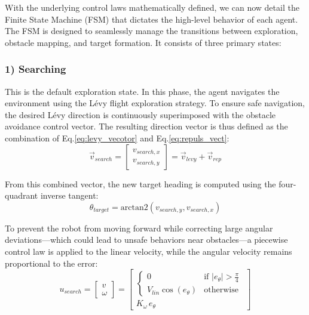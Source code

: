 \documentclass[times, twoside]{zHenriquesLab-StyleBioRxiv}
\begin{document}
With the underlying control laws mathematically defined, we can now detail the Finite State Machine (FSM) that dictates the high-level behavior of each agent. The FSM is designed to seamlessly manage the transitions between exploration, obstacle mapping, and target formation. It consists of three primary states:

\subsubsection*{1) Searching}
This is the default exploration state. In this phase, the agent navigates the environment using the Lévy flight exploration strategy. To ensure safe navigation, the desired Lévy direction is continuously superimposed with the obstacle avoidance control vector. The resulting direction vector is thus defined as the combination of Eq.\ref{eq:levy_vecotor} and Eq.\ref{eq:repuls_vect}:
\begin{equation}
    \vec{v}_{search} = \begin{bmatrix} v_{search,x} \\ v_{search,y} \end{bmatrix} = \vec{v}_{levy} + \vec{v}_{rep}
\end{equation}

From this combined vector, the new target heading is computed using the four-quadrant inverse tangent:
\begin{equation}
    \theta_{target} = \text{arctan2}(v_{search,y}, v_{search,x})
\end{equation}

To prevent the robot from moving forward while correcting large angular deviations—which could lead to unsafe behaviors near obstacles—a piecewise control law is applied to the linear velocity, while the angular velocity remains proportional to the error:
\begin{equation}
    u_{search} = \begin{bmatrix} v \\ \omega \end{bmatrix} = 
    \begin{bmatrix} 
        \begin{cases} 
            0 & \text{if } |e_\theta| > \frac{\pi}{4} \\ 
            V_{lin} \cos(e_\theta) & \text{otherwise} 
        \end{cases} \\ 
        K_\omega \, e_\theta 
    \end{bmatrix}
\end{equation}
\end{document}
